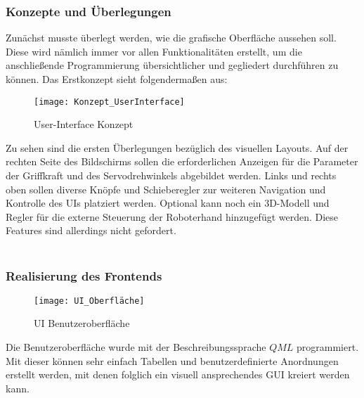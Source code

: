 \documentclass[titlepage,12pt,twoside]{article}
\begin{document}
\subsubsection{Konzepte und Überlegungen}
Zunächst musste überlegt werden, wie die grafische Oberfläche aussehen soll. Diese wird nämlich immer vor allen Funktionalitäten 
erstellt, um die anschließende Programmierung übersichtlicher und gegliedert durchführen zu können. Das Erstkonzept sieht folgendermaßen aus:
\begin{figure}[H]
	\begin{center}
		\scalebox{1.2}
		{\texttt{[image: Konzept\_UserInterface]}}
		\caption{User-Interface Konzept}
		\label{fig:Konzept_UserInterface}				
	\end{center}
\end{figure}
\hfill \break
Zu sehen sind die ersten Überlegungen bezüglich des visuellen Layouts. Auf der rechten Seite des Bildschirms sollen die erforderlichen
Anzeigen für die Parameter der Griffkraft und des Servodrehwinkels abgebildet werden. Links und rechts oben sollen diverse Knöpfe 
und Schieberegler zur weiteren Navigation und Kontrolle des UIs platziert werden. Optional kann noch ein 3D-Modell und Regler für 
die externe Steuerung der Roboterhand hinzugefügt werden. Diese Features sind allerdings nicht gefordert. \\
\\
\subsubsection{Realisierung des Frontends}
\label{chap:Realisierung des Frontends}
\begin{figure}[H]
	\begin{center}
		\scalebox{1.2}
		{\texttt{[image: UI\_Oberfläche]}}
		\caption{UI Benutzeroberfläche}
		\label{fig:UI_Oberfläche}				
	\end{center}
\end{figure}
\hfill \break
Die Benutzeroberfläche wurde mit der Beschreibungssprache $QML$ programmiert. Mit dieser können sehr einfach Tabellen und benutzerdefinierte
Anordnungen erstellt werden, mit denen folglich ein visuell ansprechendes GUI kreiert werden kann. \\
\\
\end{document}
